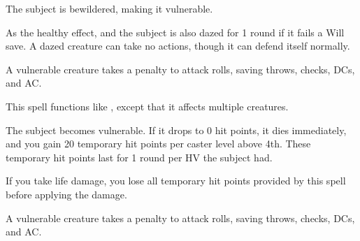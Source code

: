 \spellrng{\rngmed}
\spelldur{\durshort}
\begin{spellhealthy}
  The subject is bewildered, making it vulnerable.
\end{spellhealthy}
\begin{spellblood}
  As the healthy effect, and the subject is also dazed for 1 round if it fails a Will save. A dazed creature can take no actions, though it can defend itself normally.
\end{spellblood}
\begin{spellnotes}
  A vulnerable creature takes a  penalty to attack rolls, saving throws, checks, DCs, and AC.
\end{spellnotes}

\spellrng{\rngmed}
\begin{spelleffect}
  This spell functions like , except that it affects multiple creatures.
\end{spelleffect}

\spellrng{\rngmed}
\begin{spellblood}
  The subject becomes vulnerable. If it drops to 0 hit points, it dies immediately, and you gain 20 temporary hit points  per caster level above 4th. These temporary hit points last for 1 round per HV the subject had.

 If you take life damage, you lose all temporary hit points provided by this spell before applying the damage.
\end{spellblood}
\begin{spellnotes}
  A vulnerable creature takes a  penalty to attack rolls, saving throws, checks, DCs, and AC.
\end{spellnotes}

